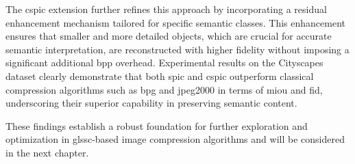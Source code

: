The \gls{cspic} extension further refines this approach by incorporating a residual enhancement mechanism tailored for specific semantic classes. This enhancement ensures that smaller and more detailed objects, which are crucial for accurate semantic interpretation, are reconstructed with higher fidelity without imposing a significant additional \gls{bpp} overhead. Experimental results on the Cityscapes dataset clearly demonstrate that both \gls{spic} and \gls{cspic} outperform classical compression algorithms such as \gls{bpg} and \gls{jpeg2000} in terms of \gls{miou} and \gls{fid}, underscoring their superior capability in preserving semantic content.

These findings establish a robust foundation for further exploration and optimization in gls{sc}-based image compression algorithms and will be considered in the next chapter.
